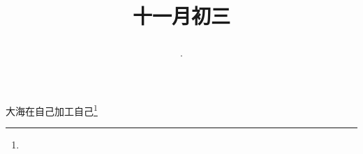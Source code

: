 \title{\date[d=3,m=12,y=2024][year:cn-y,年,month:cn,day:cn,日,·,weekday]·十一月初三 }
大海在自己加工自己\footnote{ }

